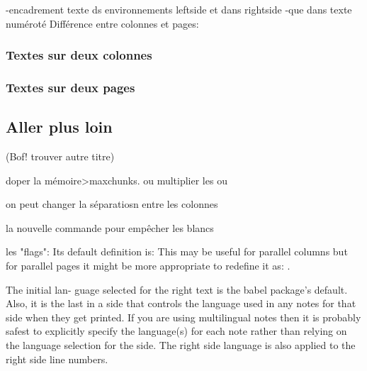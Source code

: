 -encadrement texte ds environnements leftside et dans rightside
-que dans texte numéroté
Différence entre colonnes et pages: 
\subsubsection{Textes sur deux colonnes}
\subsubsection{Textes sur deux pages}
\subsection{Aller plus loin}


(Bof! trouver autre titre)

doper la mémoire>maxchunks. ou multiplier les  ou 

on peut changer la séparatiosn entre les colonnes

la nouvelle commande pour empêcher les blancs

les "flags": Its default definition is: \newcommand*{\Rlineflag}{R} This may be useful for parallel columns but for parallel pages it might be more appropriate to redefine it as:
\renewcommand*{\Rlineflag}{}.

The initial lan- guage selected for the right text is the babel package’s default. Also, it is the last \selectlanguage in a side that controls the language used in any notes for that
side when they get printed. If you are using multilingual notes then it is probably safest to explicitly specify the language(s) for each note rather than relying on the language selection for the side. The right side language is also applied to the right side line numbers.
